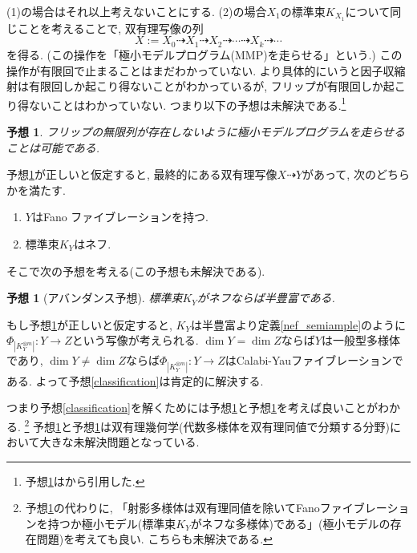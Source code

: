 \documentclass[12pt]{amsart}
\newtheorem{conj}[thm]{予想}
\theoremstyle{definition}
\theoremstyle{remark}
\begin{document}
(1)の場合はそれ以上考えないことにする. (2)の場合$X_1$の標準束$K_{X_1}$について同じことを考えることで, 
双有理写像の列
$$X:=X_{0} \dashrightarrow X_1 \dashrightarrow X_2 \dashrightarrow \cdots \dashrightarrow X_k \dashrightarrow \cdots$$
を得る. (この操作を「極小モデルプログラム(MMP)を走らせる」という.)
この操作が有限回で止まることはまだわかっていない. より具体的にいうと因子収縮射は有限回しか起こり得ないことがわかっているが, フリップが有限回しか起こり得ないことはわかっていない. つまり以下の予想は未解決である.\footnote{予想\ref{existence}は\cite[問題2]{Fjn22}から引用した. }

\begin{conj}%
\label{existence}
フリップの無限列が存在しないように極小モデルプログラムを走らせることは可能である.
\end{conj}
予想\ref{existence}が正しいと仮定すると, 最終的にある双有理写像$X \dashrightarrow Y$があって, 次のどちらかを満たす.
\begin{enumerate}
\renewcommand{\labelenumi}{$(\arabic{enumi})$.}
 \setlength{\parskip}{0cm} %
  \setlength{\itemsep}{0cm}
\item $Y$はFano ファイブレーションを持つ.
\item 標準朿$K_Y$はネフ. %
\end{enumerate}
そこで次の予想を考える(この予想も未解決である).
\begin{conj}[アバンダンス予想]
\label{Abundance}
標準束$K_Y$がネフならば半豊富である.
\end{conj}
もし予想\ref{Abundance}が正しいと仮定すると, $K_Y$は半豊富より定義\ref{nef_semiample}のように$\Phi_{|K_{Y}^{\otimes m}|} : Y \rightarrow Z$という写像が考えられる.
$\dim Y = \dim Z$ならば$Y$は一般型多様体であり, $\dim Y \neq \dim Z$ならば$\Phi_{|K_{Y}^{\otimes m}|} : Y \rightarrow Z$はCalabi-Yauファイブレーションである.
よって予想\ref{classification}は肯定的に解決する.

つまり予想\ref{classification}を解くためには予想\ref{existence}と予想\ref{Abundance}を考えば良いことがわかる.
\footnote{予想\ref{existence}の代わりに, 「射影多様体は双有理同値を除いてFanoファイブレーションを持つか極小モデル(標準束$K_Y$がネフな多様体)である」(極小モデルの存在問題)を考えても良い. こちらも未解決である.}
予想\ref{existence}と予想\ref{Abundance}は双有理幾何学(代数多様体を双有理同値で分類する分野)において大きな未解決問題となっている.
\end{document}
